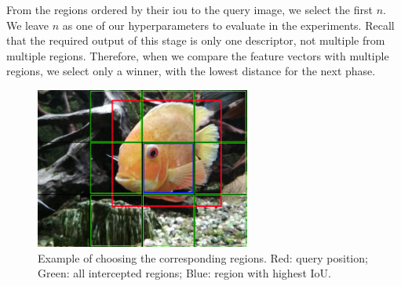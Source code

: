 From the regions ordered by their \acrshort{iou} to the query image, we select the first $n$. We leave $n$ as one of our hyperparameters to evaluate in the experiments. Recall that the required output of this stage is only one descriptor, not multiple from multiple regions. Therefore, when we compare the feature vectors with multiple regions, we select only a winner, with the lowest distance for the next phase. 



\begin{figure}
\centering
\includegraphics[width=0.63\textwidth]{img/fish_grid_regions}
\caption{Example of choosing the corresponding regions. Red: query position; Green: all intercepted regions; Blue: region with highest IoU.}
\label{fig:fish_with_grid}
\end{figure}



